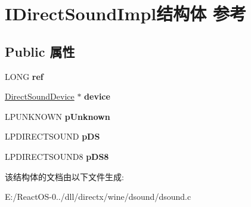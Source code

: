 \hypertarget{struct_i_direct_sound_impl}{}\section{I\+Direct\+Sound\+Impl结构体 参考}
\label{struct_i_direct_sound_impl}
\subsection*{Public 属性}
\begin{DoxyCompactItemize}
\item 
\mbox{\label{struct_i_direct_sound_impl_ab7cc4b01c9dd7065553603a37f8ec618}} 
L\+O\+NG {\bfseries ref}
\item 
\mbox{\label{struct_i_direct_sound_impl_af3e04b30280d36f5841b27f30afbab88}} 
\hyperlink{struct_direct_sound_device}{Direct\+Sound\+Device} $\ast$ {\bfseries device}
\item 
\mbox{\label{struct_i_direct_sound_impl_ab241a60c83b1f642b35fb2c520753fcb}} 
L\+P\+U\+N\+K\+N\+O\+WN {\bfseries p\+Unknown}
\item 
\mbox{\label{struct_i_direct_sound_impl_a0f7c0615c3f9b7186f63dd859d0cbc29}} 
L\+P\+D\+I\+R\+E\+C\+T\+S\+O\+U\+ND {\bfseries p\+DS}
\item 
\mbox{\label{struct_i_direct_sound_impl_ae60fec09b58102e60d84bade25d682be}} 
L\+P\+D\+I\+R\+E\+C\+T\+S\+O\+U\+N\+D8 {\bfseries p\+D\+S8}
\end{DoxyCompactItemize}


该结构体的文档由以下文件生成\+:\begin{DoxyCompactItemize}
\item 
E\+:/\+React\+O\+S-\/0../dll/directx/wine/dsound/dsound.\+c\end{DoxyCompactItemize}
